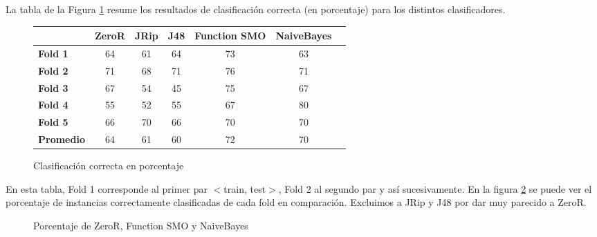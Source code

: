 La tabla de la Figura \ref{class_corr_en_pct} resume los resultados de clasificación correcta (en porcentaje) para los distintos clasificadores.

\begin{figure}[H]
\begin{table}[H]
\centering
\begin{tabular}{|l|c|c|c|c|c|c|}
\hline
\textbf{}  & \textbf{ZeroR} & \textbf{JRip} & \textbf{J48} & \textbf{Function SMO} & \textbf{NaiveBayes} \\ \hline
\textbf{Fold 1}  & 64 & 61 & 64 & 73 & 63 \\ \hline
\textbf{Fold 2}  & 71 & 68 & 71 & 76 & 71 \\ \hline
\textbf{Fold 3}  & 67 & 54 & 45 & 75 & 67 \\ \hline
\textbf{Fold 4}  & 55 & 52 & 55 & 67 & 80 \\ \hline
\textbf{Fold 5}  & 66 & 70 & 66 & 70 & 70 \\ \hline
\hline \hline
\textbf{Promedio} & 64 & 61 & 60 & 72 & 70 \\ \hline
\end{tabular}
\end{table}
\caption{Clasificación correcta en porcentaje}
\label{class_corr_en_pct}
\end{figure}

En esta tabla, Fold 1 corresponde al primer par $<$train, test$>$, Fold 2 al segundo par y así sucesivamente. En la figura \ref{porcentajexClasificador} se puede ver el porcentaje de instancias correctamente clasificadas de cada fold en comparación. Excluimos a JRip y J48 por dar muy parecido a ZeroR.

\begin{figure}[H]
\centering
{}
\caption{Porcentaje de ZeroR, Function SMO y NaiveBayes}
\label{porcentajexClasificador}
\end{figure}

